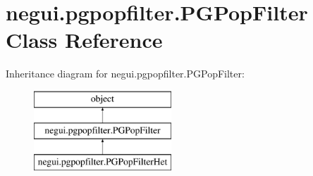 \hypertarget{classnegui_1_1pgpopfilter_1_1PGPopFilter}{}\section{negui.\+pgpopfilter.\+P\+G\+Pop\+Filter Class Reference}
\label{classnegui_1_1pgpopfilter_1_1PGPopFilter}
Inheritance diagram for negui.\+pgpopfilter.\+P\+G\+Pop\+Filter\+:\begin{figure}[H]
\begin{center}
\leavevmode
\includegraphics[height=3.000000cm]{classnegui_1_1pgpopfilter_1_1PGPopFilter}
\end{center}
\end{figure}
